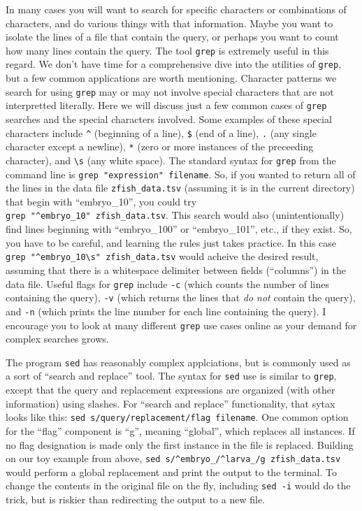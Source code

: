 \documentclass[]{book}
\begin{document}
In many cases you will want to search for specific characters or combinations of characters, and do various things with that information. Maybe you want to isolate the lines of a file that contain the query, or perhaps you want to count how many lines contain the query. The tool \texttt{grep} is extremely useful in this regard. We don't have time for a comprehensive dive into the utilities of \texttt{grep}, but a few common applications are worth mentioning. Character patterns we search for using \texttt{grep} may or may not involve special characters that are not interpretted literally. Here we will discuss just a few common cases of \texttt{grep} searches and the special characters involved. Some examples of these special characters include \texttt{\^{}} (beginning of a line), \texttt{\$} (end of a line), \texttt{.} (any single character except a newline), \texttt{*} (zero or more instances of the preceeding character), and \texttt{\textbackslash{}s} (any white space). The standard syntax for \texttt{grep} from the command line is \texttt{grep\ "expression"\ filename}. So, if you wanted to return all of the lines in the data file \texttt{zfish\_data.tsv} (assuming it is in the current directory) that begin with ``embryo\_10'', you could try \texttt{grep\ "\^{}embryo\_10"\ zfish\_data.tsv}. This search would also (unintentionally) find lines beginning with ``embryo\_100'' or ``embryo\_101'', etc., if they exist. So, you have to be careful, and learning the rules just takes practice. In this case \texttt{grep\ "\^{}embryo\_10\textbackslash{}s"\ zfish\_data.tsv} would acheive the desired result, assuming that there is a whitespace delimiter between fields (``columns'') in the data file. Useful flags for \texttt{grep} include \texttt{-c} (which counts the number of lines containing the query), \texttt{-v} (which returns the lines that \emph{do not} contain the query), and \texttt{-n} (which prints the line number for each line containing the query). I encourage you to look at many different \texttt{grep} use cases online as your demand for complex searches grows.

The program \texttt{sed} has reasonably complex applciations, but is commonly used as a sort of ``search and replace'' tool. The syntax for \texttt{sed} use is similar to \texttt{grep}, except that the query and replacement expressions are organized (with other information) using slashes. For ``search and replace'' functionality, that sytax looks like this: \texttt{sed\ \textquotesingle{}s/query/replacement/flag\textquotesingle{}\ filename}. One common option for the ``flag'' component is ``g'', meaning ``global'', which replaces all instances. If no flag designation is made only the first instance in the file is replaced. Building on our toy example from above, \texttt{sed\ \textquotesingle{}s/\^{}embryo\_/\^{}larva\_/g\textquotesingle{}\ zfish\_data.tsv} would perform a global replacement and print the output to the terminal. To change the contents in the original file on the fly, including \texttt{sed\ -i} would do the trick, but is riskier than redirecting the output to a new file.
\end{document}
